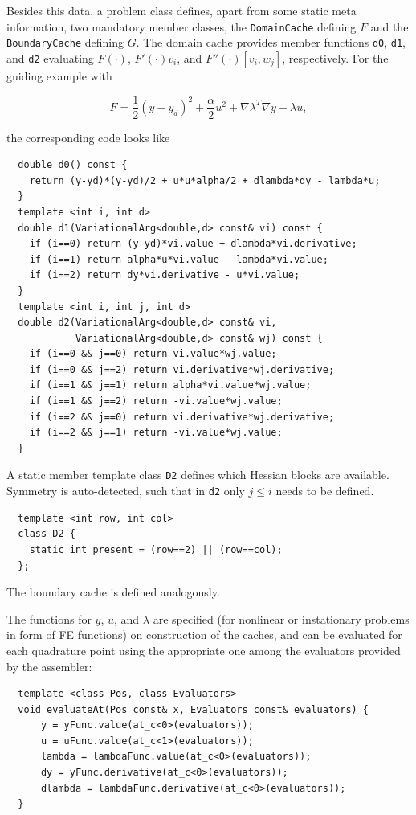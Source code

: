 \documentclass[11pt]{article}
\begin{document}
\noindent Besides this data, a problem class defines, apart from some static meta information, two mandatory member classes, the 
{\tt DomainCache} defining $F$ and the {\tt BoundaryCache} defining $G$. The domain cache provides member 
functions {\tt d0}, {\tt d1}, and {\tt d2} evaluating $F(\cdot)$, $F'(\cdot)v_i$, and $F''(\cdot)[v_i,w_j]$, 
respectively. For the  guiding example with

\[
  F = \frac{1}{2}(y-y_d)^2 + \frac{\alpha}{2}u^2 + \nabla\lambda^T \nabla y - \lambda u,
\]

\noindent the corresponding code looks like

\begin{lstlisting}
  double d0() const {
    return (y-yd)*(y-yd)/2 + u*u*alpha/2 + dlambda*dy - lambda*u;
  }
  template <int i, int d>
  double d1(VariationalArg<double,d> const& vi) const {
    if (i==0) return (y-yd)*vi.value + dlambda*vi.derivative;
    if (i==1) return alpha*u*vi.value - lambda*vi.value;
    if (i==2) return dy*vi.derivative - u*vi.value;
  }
  template <int i, int j, int d>
  double d2(VariationalArg<double,d> const& vi,
            VariationalArg<double,d> const& wj) const {
    if (i==0 && j==0) return vi.value*wj.value;
    if (i==0 && j==2) return vi.derivative*wj.derivative;
    if (i==1 && j==1) return alpha*vi.value*wj.value;
    if (i==1 && j==2) return -vi.value*wj.value;
    if (i==2 && j==0) return vi.derivative*wj.derivative;
    if (i==2 && j==1) return -vi.value*wj.value;
  }
\end{lstlisting}

\noindent A static member template class \verb?D2? defines which Hessian blocks are available. Symmetry is auto-detected, such that in \verb?d2? only $j\le i$ needs to be defined.
\begin{lstlisting}
  template <int row, int col>
  class D2 {
    static int present = (row==2) || (row==col);
  };
\end{lstlisting}

\noindent The boundary cache is defined analogously.

The functions for $y$, $u$, and $\lambda$ are specified (for nonlinear or instationary problems in form of FE functions) on construction of the caches, and can be evaluated for each quadrature point using the appropriate one among the evaluators provided by the assembler:
\begin{lstlisting}
  template <class Pos, class Evaluators>
  void evaluateAt(Pos const& x, Evaluators const& evaluators) {
      y = yFunc.value(at_c<0>(evaluators));
      u = uFunc.value(at_c<1>(evaluators));
      lambda = lambdaFunc.value(at_c<0>(evaluators));
      dy = yFunc.derivative(at_c<0>(evaluators));
      dlambda = lambdaFunc.derivative(at_c<0>(evaluators));
  }
\end{lstlisting}
\end{document}
